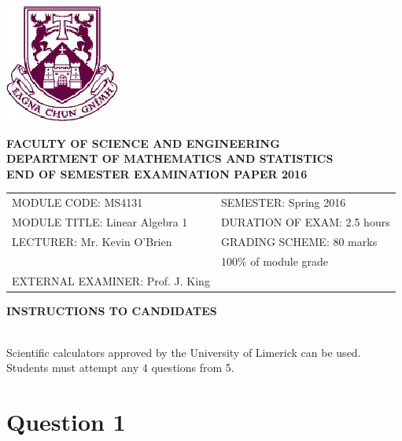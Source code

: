 \documentclass[a4paper,12pt]{article}
\begin{document}
\begin{center}
\includegraphics[scale=0.65]{shieldtransparent2}
\end{center}

\begin{center}
\vspace{1cm}
\large \bf {FACULTY OF SCIENCE AND ENGINEERING} \\[0.5cm]
\normalsize DEPARTMENT OF MATHEMATICS AND STATISTICS \\[1.25cm]
\large \bf {END OF SEMESTER EXAMINATION PAPER 2016} \\[1.5cm]
\end{center}

\begin{tabular}{ll}
MODULE CODE: MS4131 & SEMESTER: Spring 2016 \\[1cm]
MODULE TITLE: Linear Algebra 1 & DURATION OF EXAM: 2.5 hours \\[1cm]
LECTURER: Mr. Kevin O'Brien & GRADING SCHEME: 80 marks \\
& \phantom{GRADING SCHEME:} \footnotesize {100\% of module grade} \\[0.8cm]
EXTERNAL EXAMINER: Prof. J. King & \\
\end{tabular}
\bigskip
\begin{center}
{\bf INSTRUCTIONS TO CANDIDATES}
\end{center}

{\noindent \\ Scientific calculators approved by the University of Limerick can be used. \\
Students must attempt any 4 questions from 5.}
\newpage
\section*{Question 1}
\end{document}
